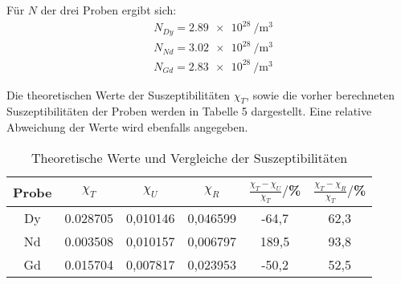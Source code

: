 Für $N$ der drei Proben ergibt sich:
\begin{align*}
  &N_{Dy} = \SI{2.89e28}{\per\meter^3} \\
  &N_{Nd} = \SI{3.02e28}{\per\meter^3} \\
  &N_{Gd} = \SI{2.83e28}{\per\meter^3}
\end{align*}

Die theoretischen Werte der Suszeptibilitäten $\chi_T$, sowie die vorher berechneten Suszeptibilitäten
der Proben werden in Tabelle 5 dargestellt. Eine relative Abweichung der Werte wird ebenfalls angegeben.

\begin{table}[H]
  \centering
  \caption{Theoretische Werte und Vergleiche der Suszeptibilitäten}
  \label{tab:Dy}
  \begin{tabular}{c c c c c c}
    \toprule
    Probe & $\chi_T$ & $\chi_U$ & $\chi_R$ & $\frac{\chi_T - \chi_U}{\chi_T}/$\%  & $\frac{\chi_T - \chi_R}{\chi_T}/$\% \\
    \midrule
    Dy & 0.028705 & 0,010146& 0,046599 & -64,7 & 62,3\\
    Nd & 0.003508 & 0,010157& 0,006797 & 189,5 & 93,8\\
    Gd & 0.015704 & 0,007817& 0,023953 & -50,2 & 52,5\\
    \bottomrule
  \end{tabular}
\end{table}
